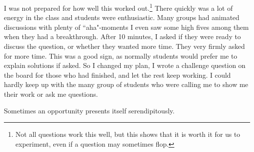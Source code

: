 \documentclass[11pt]{article}
\begin{document}
\begin{example}
\begin{comments}
{			I was not prepared for how well this worked out.\footnote{Not all questions work this well, but this shows that it is worth it for us to experiment, even if a question may sometimes flop.} There quickly was a lot of energy in the class and students were enthusiastic. Many groups had animated discussions with plenty of ``aha"-moments I even saw some high fives among them when they had a breakthrough. After 10 minutes, I asked if they were ready to discuss the question, or whether they wanted more time. They very firmly asked for more time. This was a good sign, as normally students would prefer me to explain solutions if asked. So I changed my plan, I wrote a challenge question on the board for those who had finished, and let the rest keep working. I could hardly keep up with the many group of students who were calling me to show me their work or ask me questions. }
		\end{comments}
	\end{example}

	\newpage

	Sometimes an opportunity presents itself serendipitously.
\end{document}
